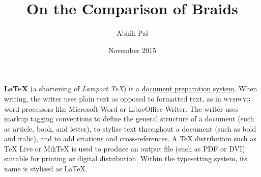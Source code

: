 \documentclass{article}
\title{On the Comparison of Braids}
\author{Abhik Pal}
\date{November 2015}
\begin{document}
\maketitle

\textbf{LaTeX} (a shortening of \emph{Lamport TeX}) is a \underline{document preparation system}. When writing, the writer uses plain text as opposed to formatted text, as in \textsc{wysiwyg} word
processors like Microsoft Word or LibreOffice Writer. The writer uses markup tagging conventions
to define the general structure of a document (such as article, book, and letter), to stylise text
throughout a document (such as bold and italic), and to add citations and cross-references. A TeX
distribution such as TeX Live or MikTeX is used to produce an output file (such as PDF or DVI)
suitable for printing or digital distribution. Within the typesetting system, its name is stylised
as \LaTeX.
\end{document}
